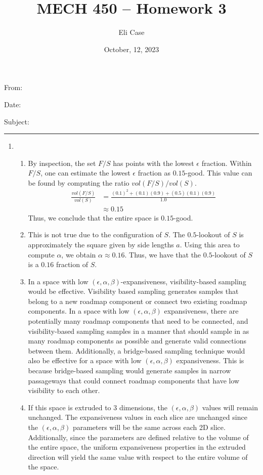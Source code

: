 \documentclass[11pt]{article}
\author{Eli Case}
\title{MECH 450 -- Homework 3}
\date{October, 12, 2023}
\begin{document}
\flushleft
\thispagestyle{plain}

From: \@author

Date: \@date

Subject: \@title

\makeatother
\medskip
\hrule
\medskip

\begin{enumerate}[leftmargin=0.3in]

   \item %
   \begin{enumerate}
       \item By inspection, the set $F/S$ has points with the lowest $\epsilon$ fraction. Within $F/S$, one can estimate the lowest $\epsilon$ fraction as $0.15$-good. This value can be found by computing the ratio $vol(F/S)/vol(S)$.
        \begin{align*}
            \frac{vol(F/S)}{vol(S)} &= \frac{(0.1)^2 + (0.1)(0.9) + (0.5)(0.1)(0.9)}{1.0} \\
                                    & \approx 0.15
        \end{align*}
       Thus, we conclude that the entire space is $0.15$-good.

   \item This is not true due to the configuration of $S$. The $0.5$-lookout of $S$ is approximately the square given by side lengths $a$. Using this area to compute $\alpha$, we obtain $\alpha \approx 0.16$. Thus, we have that the $0.5$-lookout of $S$ is a $0.16$ fraction of $S$.

   \item  In a space with low $(\epsilon, \alpha, \beta)$-expansiveness, visibility-based sampling would be effective. Visibility based sampling generates samples that belong to a new roadmap component or connect two existing roadmap components. In a space with low $(\epsilon, \alpha, \beta)$ expansiveness, there are potentially many roadmap components that need to be connected, and visibility-based sampling samples in a manner that should sample in as many roadmap components as possible and generate valid connections between them. Additionally, a bridge-based sampling technique would also be effective for a space with low $(\epsilon, \alpha, \beta)$ expansiveness. This is because bridge-based sampling would generate samples in narrow passageways that could connect roadmap components that have low visibility to each other.
 
   \item If this space is extruded to 3 dimensions, the $(\epsilon, \alpha, \beta)$ values will remain unchanged. The expansiveness values in each slice are unchanged since the $(\epsilon, \alpha, \beta)$ parameters will be the same across each 2D slice. Additionally, since the parameters are defined relative to the volume of the entire space, the uniform expansiveness properties in the extruded direction will yield the same value with respect to the entire volume of the space. 


\end{enumerate}
\end{enumerate}
\end{document}
